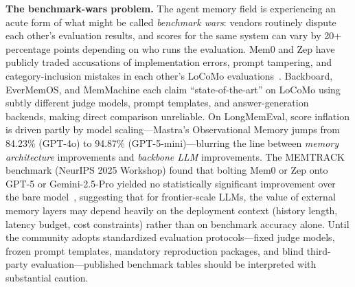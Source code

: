 
\smallskip
\noindent\textbf{The benchmark-wars problem.}\enspace
The agent memory field is experiencing an acute form of what might be called \emph{benchmark wars}:
vendors routinely dispute each other's evaluation results, and scores for the same system
can vary by 20+ percentage points depending on who runs the evaluation.
Mem0 and Zep have publicly traded accusations of implementation errors, prompt tampering,
and category-inclusion mistakes in each other's LoCoMo evaluations~\cite{zep2025,choudhary2025mem0,mem0replication2025}.
Backboard, EverMemOS, and MemMachine each claim ``state-of-the-art'' on LoCoMo using
subtly different judge models, prompt templates, and answer-generation backends,
making direct comparison unreliable.
On LongMemEval, score inflation is driven partly by model scaling---Mastra's Observational
Memory jumps from 84.23\% (GPT-4o) to 94.87\% (GPT-5-mini)---blurring the line between
\emph{memory architecture} improvements and \emph{backbone LLM} improvements.
The MEMTRACK benchmark (NeurIPS 2025 Workshop) found that bolting Mem0 or Zep onto
GPT-5 or Gemini-2.5-Pro yielded no statistically significant improvement over the bare
model~\cite{memtrack2025}, suggesting that for frontier-scale LLMs, the value of external
memory layers may depend heavily on the deployment context (history length, latency budget,
cost constraints) rather than on benchmark accuracy alone.
Until the community adopts standardized evaluation protocols---fixed judge models,
frozen prompt templates, mandatory reproduction packages, and blind third-party
evaluation---published benchmark tables should be interpreted with substantial caution.

